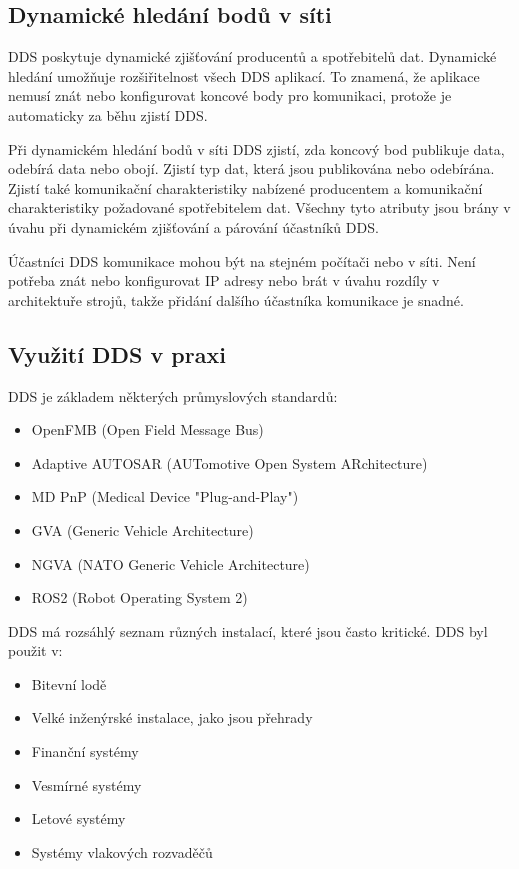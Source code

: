 \subsection{Dynamické hledání bodů v síti}

\acs{DDS} poskytuje dynamické zjišťování producentů a spotřebitelů dat. Dynamické hledání umožňuje rozšiřitelnost všech \acs{DDS} aplikací. To znamená, že aplikace nemusí znát nebo konfigurovat koncové body pro komunikaci, protože je automaticky za běhu zjistí \acs{DDS}.

Při dynamickém hledání bodů v síti \acs{DDS} zjistí, zda koncový bod publikuje data, odebírá data nebo obojí. Zjistí typ dat, která jsou publikována nebo odebírána. Zjistí také komunikační charakteristiky nabízené producentem a komunikační charakteristiky požadované spotřebitelem dat. Všechny tyto atributy jsou brány v úvahu při dynamickém zjišťování a párování účastníků \acs{DDS}. \cite{DDS_Main}

Účastníci \acs{DDS} komunikace mohou být na stejném počítači nebo v síti. Není potřeba znát nebo konfigurovat IP adresy nebo brát v úvahu rozdíly v architektuře strojů, takže přidání dalšího účastníka komunikace je snadné.

\subsection{Využití \acs{DDS} v praxi}

\acl{DDS} je základem některých průmyslových standardů: \cite{DDS_usage}

\begin{itemize}
    \item OpenFMB (Open Field Message Bus)
    \item Adaptive AUTOSAR (AUTomotive Open System ARchitecture)
    \item MD PnP (Medical Device "Plug-and-Play")
    \item GVA (Generic Vehicle Architecture)
    \item NGVA (NATO Generic Vehicle Architecture)
    \item ROS2 (Robot Operating System 2) \\[0.2cm]
\end{itemize}

\acs{DDS} má rozsáhlý seznam různých instalací, které jsou často kritické. \acs{DDS} byl použit v: \cite{ROS2DDS}

\begin{itemize}
    \item Bitevní lodě
    \item Velké inženýrské instalace, jako jsou přehrady
    \item Finanční systémy
    \item Vesmírné systémy
    \item Letové systémy
    \item Systémy vlakových rozvaděčů
\end{itemize}
